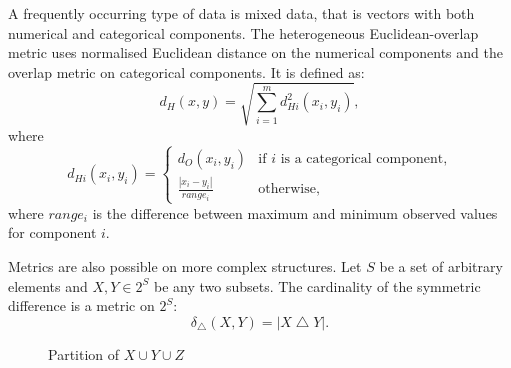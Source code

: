 \documentclass[a4paper]{report}
\DeclareMathOperator{\symdif}{\bigtriangleup}
\begin{document}
A frequently occurring type of data is mixed data, that is vectors with both
numerical and categorical components.  The heterogeneous Euclidean-overlap
metric uses normalised Euclidean distance on the numerical components and the
overlap metric on categorical components.  It is defined as:
\begin{equation*}
  d_{H}(x,y) = \sqrt{\sum_{i=1}^{m} d_{Hi}^2(x_i,y_i)},
\end{equation*}
where
\begin{equation*}
  d_{Hi}(x_i,y_i) =
  \begin{cases}
    d_O(x_i,y_i) & \text{if $i$ is a categorical component,} \\
    \displaystyle \frac{|x_i-y_i|}{range_i} & \text{otherwise,}
  \end{cases}
\end{equation*}
where $range_i$ is the difference between maximum and minimum observed values
for component $i$.

Metrics are also possible on more complex structures.  Let $S$ be a set of
arbitrary elements and $X,Y \in 2^{S}$ be any two subsets.  The cardinality of
the symmetric difference is a metric on $2^{S}$:
\begin{equation*}
  \delta_{\symdif}(X,Y) = |X \symdif Y|.
\end{equation*}

\begin{figure}
  \centering
  \caption{Partition of $X \cup Y \cup Z$}
  \label{fig:partition}
\end{figure}
\end{document}
